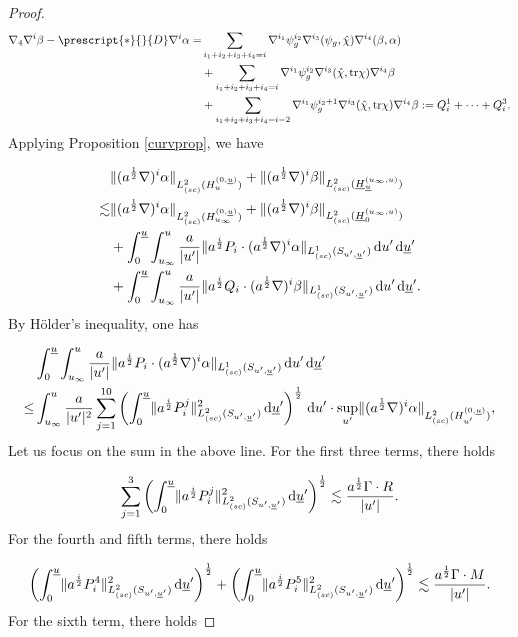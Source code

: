 \documentclass{amsart}
\newcommand{\psig}{\psi_g}
\newcommand{\aln}{(\al \nabla)^i}
\newcommand{\ali}{a^{\frac{i}{2}}}
\newcommand{\dubarprime}{\hspace{.5mm} \text{d} \ubar^{\prime}}
\newcommand{\intu}{\int_{u_{\infty}}^u}
\newcommand{\intubar}{\int_0^{\ubar}}
\newcommand{\chihat}{\hat{\chi}}
\newcommand{\upr}{\lvert u^\prime \rvert}
\newcommand{\al}{a^{\frac{1}{2}}}
\newcommand{\ubar}{\underline{u}}
\newcommand{\sumif}{\sum_{i_1+i_2+i_3+i_4=i}}
\newcommand{\sumifim}{\sum_{i_1+i_2+i_3+i_4=i-2}}
\newcommand{\nablap}{\nabla^{i_1}\psi_g^{i_2}}
\newcommand{\nablapp}{\nabla^{i_1}\psi_g^{i_2+1}}
\newcommand{\scaleoneSuprimeubarprime}[1]{\lVert{#1} \rVert_{L^1_{(sc)}(S_{u^\prime,\ubar^\prime})}}
\newcommand{\scaletwoSuprimeubarprime}[1]{\lVert{#1} \rVert_{L^2_{(sc)}(S_{u^\prime,\ubar^\prime})}}
\newcommand{\scaletwoHzero}[1]{\lVert{#1} \rVert_{L^2_{(sc)}(H_{u_{\infty}}^{(0,\underline{u})})}}
\newcommand{\scaletwoHu}[1]{\lVert{#1} \rVert_{L^2_{(sc)}(H_u^{(0,\underline{u})})}}
\newcommand{\scaletwoHbarzero}[1]{\lVert{#1} \rVert_{L^2_{(sc)}(\underline{H}_{0}^{(u_{\infty},u)})}}
\newcommand{\scaletwoHbaru}[1]{\lVert{#1} \rVert_{L^2_{(sc)}(\underline{H}_{\underline{u}}^{(u_{\infty},u)})}}
\newcommand{\duprime}{\hspace{.5mm} \text{d}u^{\prime}}
\newcommand{\nablat}{\nabla^{i_3}}
\newcommand{\nablaf}{\nabla^{i_4}}
\newcommand{\Hodge}[1]{\prescript{*}{}{#1}}
\newcommand{\tr}{\mbox{tr}}
\begin{document}
{\begin{proof}
    \begin{align}
         \nonumber    \nabla_4 \nabla^i \beta - \Hodge{D}\nabla^i \alpha= &\sumif \nablap \nablat(\psig, \chihat)\nablaf(\beta,\alpha)\\ &+ \sumif \nablap \nablat(\chihat,\tr\chi)\nablaf \beta \\ \nonumber &+ \sumifim \nablapp \nablat (\chihat,\tr\chi)\nablaf \beta:= Q_i^1 + \dots + Q_i^3.
        \end{align}
Applying Proposition \ref{curvprop}, we have

\begin{equation}
    \begin{split}
        &\scaletwoHu{\aln \alpha} + \scaletwoHbaru{\aln \beta} \\ \lesssim & \scaletwoHzero{\aln \alpha} + \scaletwoHbarzero{\aln \beta} \\&+  \intubar \intu  \frac{a}{\upr} \scaleoneSuprimeubarprime{\ali P_i \cdot \aln \alpha }  \duprime \dubarprime
        \\ &+\intubar \intu  \frac{a}{\upr} \scaleoneSuprimeubarprime{\ali Q_i \cdot \aln \beta }  \duprime \dubarprime.
        \end{split}
\end{equation}By H\"older's inequality, one has

\begin{equation}
    \begin{split}
         &\intubar \intu  \frac{a}{\upr} \scaleoneSuprimeubarprime{\ali P_i \cdot \aln \alpha }  \duprime \dubarprime \\\leq&\intu \frac{a}{\upr^2} \sum_{j=1}^{10}\left(  \intubar \scaletwoSuprimeubarprime{\ali P_i^j }^2\dubarprime \right)^{\frac{1}{2}}\duprime
        \cdot \sup_{u^{\prime}} \lVert \aln \alpha \rVert_{L^2_{(sc)}(H_{u^{\prime}}^{(0,\ubar)})},
    \end{split}
\end{equation}Let us focus on the sum in the above line. For the first three terms, there holds

\[ \sum_{j=1}^3 \left( \intubar \scaletwoSuprimeubarprime{\ali P_i^j}^2 \dubarprime \right)^{\frac{1}{2}}\lesssim \frac{\al \Gamma \cdot R}{\upr}. \]For the fourth and fifth terms, there holds

\[ \left( \intubar \scaletwoSuprimeubarprime{\ali P_i^4}^2 \dubarprime \right)^{\frac{1}{2}} + \left( \intubar \scaletwoSuprimeubarprime{\ali P_i^5}^2 \dubarprime \right)^{\frac{1}{2}}\lesssim \frac{\al \Gamma \cdot M}{\upr}. \] For the sixth term, there holds



\end{proof}}
\end{document}
